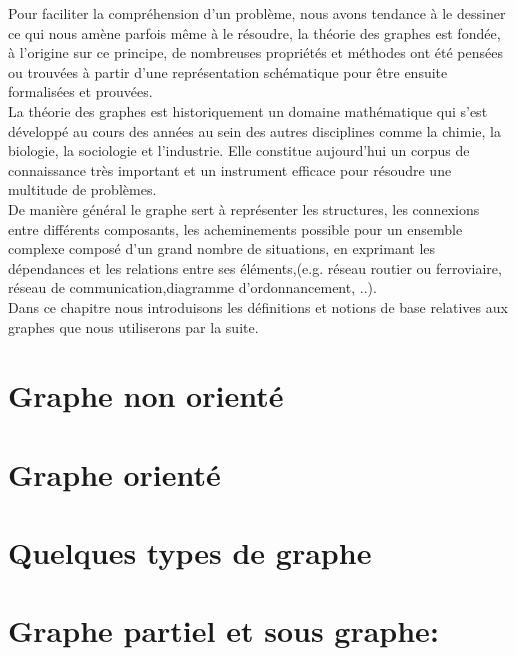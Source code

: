 Pour faciliter la compréhension d’un problème, nous avons tendance à  le dessiner ce qui nous amène parfois même à le résoudre, la théorie des graphes est fondée, à l’origine sur ce principe, de nombreuses propriétés et méthodes ont été pensées ou trouvées à partir d’une représentation schématique pour être ensuite formalisées et prouvées.\\
La théorie des graphes est historiquement un domaine mathématique qui s’est développé au cours des années au sein des autres disciplines comme la chimie, la biologie, la sociologie et l'industrie. Elle constitue aujourd'hui un corpus de connaissance très important et un instrument efficace pour résoudre une multitude de problèmes.\\	
De manière général le graphe sert à représenter les structures, les connexions entre différents composants, les acheminements possible pour un ensemble complexe composé d'un grand nombre de situations, en exprimant les dépendances et les relations entre ses éléments,(e.g. réseau routier ou ferroviaire, réseau de communication,diagramme d'ordonnancement, ..). \\
Dans ce chapitre nous introduisons les définitions et notions de base relatives aux graphes que nous utiliserons par la suite.
	
	
	\section{Graphe non orienté}
		
			
	\section{Graphe orienté}	
		
	
	\section{Quelques types de graphe}
			
	
	\section{Graphe partiel et sous graphe:}
    			
    		
